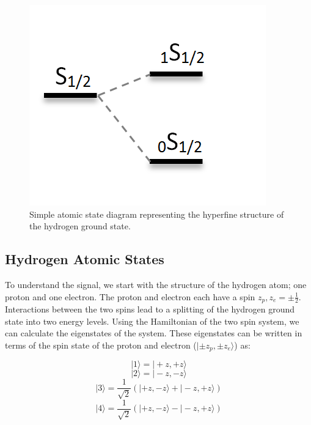 \begin{figure}[htb]
\begin{center}
\includegraphics[width=0.95\linewidth]{Introduction/figures/1s_spin_states.png}
\caption{Simple atomic state diagram representing the hyperfine structure of the hydrogen ground state.}
\label{Fig:spin_states}
\end{center}
\end{figure}


\subsection{Hydrogen Atomic States}

To understand the \cm signal, we start with the structure of the hydrogen atom; 
one proton and one electron. The proton and electron each have a spin $z_p,z_e = \pm \frac{1}{2}$. Interactions between the two spins lead to a splitting of the hydrogen ground state into two energy levels. Using the Hamiltonian of the two spin system, we can calculate the eigenstates of the system. These eigenstates can be written in terms of the spin state of the proton and electron ($| \pm z_p, \pm z_e \rangle$) as:

\begin{equation}
| 1 \rangle = | + z , + z \rangle 
\end{equation}
\begin{equation}
| 2 \rangle = | - z, - z \rangle 
\end{equation}
\begin{equation}
| 3 \rangle = \frac{1}{\sqrt{2}} (| + z, - z \rangle + |-z, +z \rangle) 
\end{equation}
\begin{equation}
| 4 \rangle = \frac{1}{\sqrt{2}} (| + z, - z \rangle - |-z, +z \rangle)
\end{equation}


